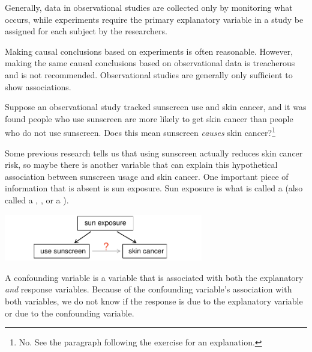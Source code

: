 Generally, data in observational studies are collected only by monitoring what occurs, while experiments require the primary explanatory variable in a study be assigned for each subject by the researchers.

Making causal conclusions based on experiments is often reasonable. However, making the same causal conclusions based on observational data is treacherous and is not recommended. Observational studies are generally only sufficient to show associations.

\begin{exercise} \label{sunscreenLurkingExample}
Suppose an observational study tracked sunscreen use and skin cancer, and it was found people who use sunscreen are more likely to get skin cancer than people who do not use sunscreen. Does this mean sunscreen \emph{causes} skin cancer?\footnote{No. See the paragraph following the exercise for an explanation.}
\end{exercise}


Some previous research tells us that using sunscreen actually reduces skin cancer risk, so maybe there is another variable that can explain this hypothetical association between sunscreen usage and skin cancer. One important piece of information that is absent is sun exposure. Sun exposure is what is called a  (also called a , , or a ).
\begin{center}
\includegraphics[width=0.65\textwidth]{ch_data_collection/figures/variables/sunCausesCancer}
\end{center}



\begin{termBox}{
A confounding variable is a variable that is associated with both the explanatory \emph{and} response variables. Because of the confounding variable's association with both variables, we do not know if the response is due to the explanatory variable or due to the confounding variable.}
\end{termBox}

